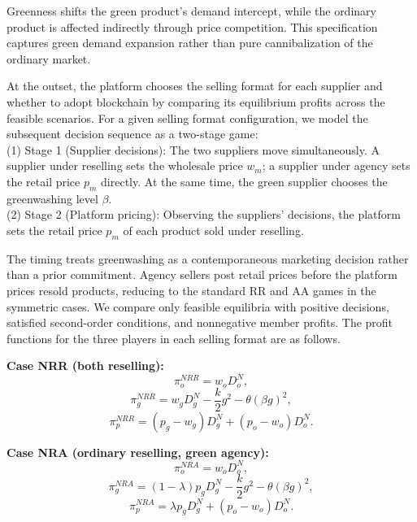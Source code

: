 \documentclass[preprint,review,12pt,authoryear,nopreprintline]{elsarticle}
\theoremstyle{definition}
\begin{document}
Greenness shifts the green product's demand intercept, while the ordinary product is affected indirectly through price competition. This specification captures green demand expansion rather than pure cannibalization of the ordinary market.

At the outset, the platform chooses the selling format for each supplier and whether to adopt blockchain by comparing its equilibrium profits across the feasible scenarios. For a given selling format configuration, we model the subsequent decision sequence as a two-stage game: \\
(1) Stage 1 (Supplier decisions): The two suppliers move simultaneously. A supplier under reselling sets the wholesale price $w_m$; a supplier under agency sets the retail price $p_m$ directly. At the same time, the green supplier chooses the greenwashing level $\beta$. \\
(2) Stage 2 (Platform pricing): Observing the suppliers' decisions, the platform sets the retail price $p_m$ of each product sold under reselling.

The timing treats greenwashing as a contemporaneous marketing decision rather than a prior commitment. Agency sellers post retail prices before the platform prices resold products, reducing to the standard RR and AA games in the symmetric cases. We compare only feasible equilibria with positive decisions, satisfied second-order conditions, and nonnegative member profits. The profit functions for the three players in each selling format are as follows.

\noindent\textbf{Case NRR (both reselling):}
\begin{equation} \label{eq:profit-RR}
\pi_o^{NRR}=w_oD_o^N,
\end{equation}
\begin{equation}
\pi_g^{NRR}=w_g D_g^N-\frac{k}{2}g^2-\theta (\beta g)^2,
\end{equation}
\begin{equation}
\pi_p^{NRR}=(p_g-w_g)D_g^N+(p_o-w_o)D_o^N.
\end{equation}

\noindent\textbf{Case NRA (ordinary reselling, green agency):}
\begin{equation}  \label{eq:profit-RA}
\pi_o^{NRA}=w_oD_o^N,
\end{equation}
\begin{equation}
\pi_g^{NRA}=(1-\lambda)p_g D_g^N-\frac{k}{2}g^2-\theta (\beta g)^2,
\end{equation}
\begin{equation}
\pi_p^{NRA}=\lambda p_gD_g^N+(p_o-w_o)D_o^N.
\end{equation}
\end{document}
